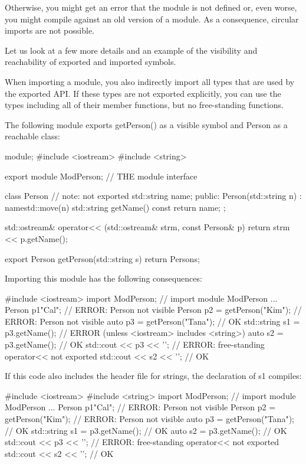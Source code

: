 Otherwise, you might get an error that the module is not defined or, even worse, you might compile against an old version of a module. As a consequence, circular imports are not possible.





Let us look at a few more details and an example of the visibility and reachability of exported and imported symbols.

When importing a module, you also indirectly import all types that are used by the exported API. If these types are not exported explicitly, you can use the types including all of their member functions, but no free-standing functions.

The following module exports getPerson() as a visible symbol and Person as a reachable class:


\begin{cpp}
module;
#include <iostream>
#include <string>

export module ModPerson; // THE module interface

class Person { // note: not exported
	std::string name;
public:
	Person(std::string n)
	: name{std::move(n)} {
	}
	std::string getName() const {
		return name;
	}
};

std::ostream& operator<< (std::ostream& strm, const Person& p)
{
	return strm << p.getName();
}

export Person getPerson(std::string s) {
	return Person{s};
}
\end{cpp}

Importing this module has the following consequences:

\begin{cpp}
#include <iostream>
import ModPerson; // import module ModPerson
...
Person p1{"Cal"}; // ERROR: Person not visible
Person p2 = getPerson("Kim"); // ERROR: Person not visible
auto p3 = getPerson("Tana"); // OK
std::string s1 = p3.getName(); // ERROR (unless <iostream> includes <string>)
auto s2 = p3.getName(); // OK
std::cout << p3 << '\n'; // ERROR: free-standing operator<< not exported
std::cout << s2 << '\n'; // OK
\end{cpp}

If this code also includes the header file for strings, the declaration of s1 compiles:

\begin{cpp}
#include <iostream>
#include <string>
import ModPerson; // import module ModPerson
...
Person p1{"Cal"}; // ERROR: Person not visible
Person p2 = getPerson("Kim"); // ERROR: Person not visible
auto p3 = getPerson("Tana"); // OK
std::string s1 = p3.getName(); // OK
auto s2 = p3.getName(); // OK
std::cout << p3 << '\n'; // ERROR: free-standing operator<< not exported
std::cout << s2 << '\n'; // OK
\end{cpp}

